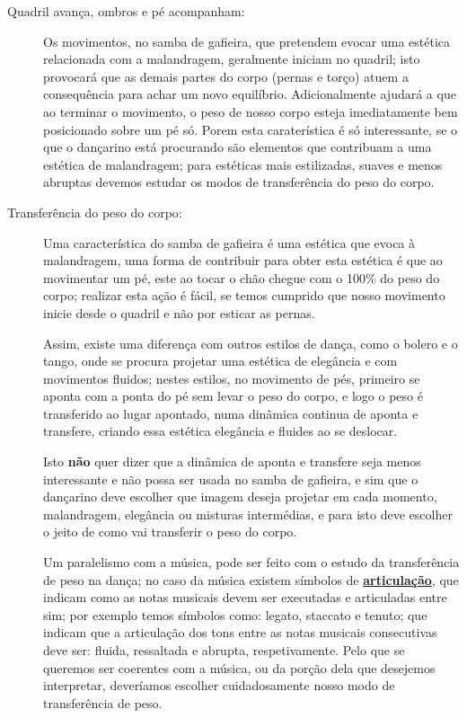 \begin{description}
\item[Quadril avança, ombros e pé acompanham:]  Os movimentos, no samba de gafieira, 
que pretendem evocar uma estética relacionada com a malandragem,  geralmente iniciam no quadril;
isto provocará que as demais partes do corpo (pernas e torço) atuem a consequência para achar um novo equilíbrio.
Adicionalmente ajudará a que ao terminar o movimento, o peso de nosso corpo esteja imediatamente bem posicionado sobre um pé só.
Porem esta caraterística é só interessante, 
se o que o dançarino está procurando são elementos que contribuam a uma estética de malandragem;
para estéticas mais estilizadas, suaves e menos abruptas devemos estudar os modos de transferência do peso do corpo.

\item[Transferência do peso do corpo:] %
Uma característica do samba de gafieira é uma estética que evoca à malandragem, 
uma forma de contribuir para obter esta estética é que ao movimentar um pé, 
este ao tocar o chão chegue com o 100\% do peso do corpo; realizar esta ação é fácil, 
se temos cumprido que nosso movimento inicie desde o quadril e não por esticar as pernas.

Assim, existe uma diferença com outros estilos de dança, 
como o bolero e o tango, 
onde se procura projetar uma estética de elegância e com movimentos fluidos;
nestes estilos, no movimento de pés, primeiro se aponta com a ponta do pé sem levar o peso do corpo,
 e logo o peso é transferido ao lugar apontado, numa dinâmica continua de aponta e transfere,
criando essa estética elegância e fluides ao se deslocar.

Isto \textbf{não} quer dizer que a dinâmica de aponta e transfere seja menos interessante e não possa ser usada no samba de gafieira,
e sim que o dançarino deve escolher que imagem deseja projetar em cada momento,
malandragem, elegância ou misturas intermédias, e para isto deve escolher o jeito de como vai transferir o peso do corpo. 

Um paralelismo com a música, pode ser feito com o estudo da transferência de peso na dança;
no caso da música existem símbolos de \hyperref[sub:Articulation]{\textbf{articulação}}, 
que indicam como as notas musicais devem ser executadas e articuladas entre sim;
por exemplo temos símbolos como: legato, staccato e tenuto;
que indicam que a articulação dos tons entre as notas musicais consecutivas deve ser: fluida, ressaltada e  abrupta, respetivamente.
Pelo que se queremos ser coerentes com a música, 
ou da porção dela que desejemos interpretar,
deveríamos escolher cuidadosamente nosso modo de transferência de peso.



\end{description}
